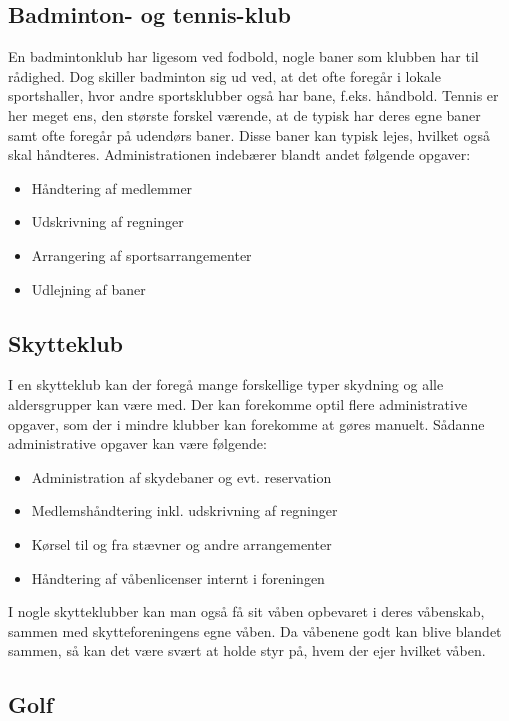 \subsection{Badminton- og tennis-klub}

En badmintonklub har ligesom ved fodbold, nogle baner som klubben har til rådighed. Dog skiller badminton sig ud ved, at det ofte foregår i lokale sportshaller, hvor andre sportsklubber også har bane, f.eks. håndbold. Tennis er her meget ens, den største forskel værende, at de typisk har deres egne baner samt ofte foregår på udendørs baner. Disse baner kan typisk lejes, hvilket også skal håndteres. Administrationen indebærer blandt andet følgende opgaver:

\begin{itemize}
\item Håndtering af medlemmer
\item Udskrivning af regninger
\item Arrangering af sportsarrangementer
\item Udlejning af baner
\end{itemize}

\subsection{Skytteklub}

I en skytteklub kan der foregå mange forskellige typer skydning og alle aldersgrupper kan være med. Der kan forekomme optil flere administrative opgaver, som der i mindre klubber kan forekomme at gøres manuelt. Sådanne administrative opgaver kan være følgende:

\begin{itemize}
\item Administration af skydebaner og evt. reservation
\item Medlemshåndtering inkl. udskrivning af regninger
\item Kørsel til og fra stævner og andre arrangementer
\item Håndtering af våbenlicenser internt i foreningen
\end{itemize}

I nogle skytteklubber kan man også få sit våben opbevaret i deres våbenskab, sammen med skytteforeningens egne våben. Da våbenene godt kan blive blandet sammen, så kan det være svært at holde styr på, hvem der ejer hvilket våben.


\subsection{Golf}

